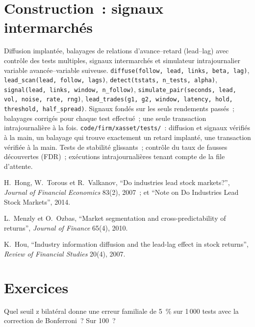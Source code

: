 \section{Construction~: signaux intermarchés}\label{bld:s1:cross-asset-lead-lag:xasset}

\begin{build}
 Diffusion implantée, balayages de relations d'avance--retard (lead--lag) avec contrôle des tests multiples, signaux intermarchés et simulateur intrajournalier variable avancée--variable suiveuse.
 \texttt{diffuse(follow, lead, links, beta, lag)}, \texttt{lead\_scan(lead, follow, lags)}, \texttt{detect(tstats, n\_tests, alpha)},
\texttt{signal(lead, links, window, n\_follow)}, \texttt{simulate\_pair(seconds, lead, vol, noise, rate, rng)},
\texttt{lead\_trades(g1, g2, window, latency, hold, threshold, half\_spread)}.
 Signaux fondés sur les seuls rendements passés~; balayages corrigés pour chaque test effectué~; une seule transaction intrajournalière à la fois.
 \texttt{code/firm/xasset/tests/}~: diffusion et signaux vérifiés à la main, un balayage qui trouve exactement un retard implanté, une transaction
vérifiée à la main.
 Tests de stabilité glissants~; contrôle du taux de fausses découvertes (FDR)~; exécutions intrajournalières tenant compte de la file d'attente.
\end{build}

\begin{omsources}
\item H.~Hong, W.~Torous et R.~Valkanov, ``Do industries lead stock markets?'', \emph{Journal of Financial Economics} 83(2), 2007~; et ``Note on Do
Industries Lead Stock Markets'', 2014.
\item L.~Menzly et O.~Ozbas, ``Market segmentation and cross-predictability of returns'', \emph{Journal of Finance} 65(4), 2010.
\item K.~Hou, ``Industry information diffusion and the lead-lag effect in stock returns'', \emph{Review of Financial Studies} 20(4), 2007.
\end{omsources}

\section{Exercices}

\begin{exercise}[$\star$]\label{exo:s1:cross-asset-lead-lag:1}
Quel seuil z bilatéral donne une erreur familiale de 5~\% sur 1\,000 tests avec la correction de Bonferroni~? Sur 100~?
\end{exercise}

